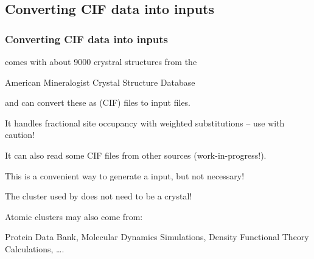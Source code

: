\subsection{ Converting CIF data into {\feff} inputs}
\begin{frame}[fragile] \frametitle{Converting CIF data into {\feff} inputs}

\begin{cenpage}{95mm}

  {\larch} comes with about 9000 crystral structures from the

\end{cenpage}

  \begin{cenpage}{75mm}
    American Mineralogist Crystal Structure Database
  \end{cenpage}

\begin{cenpage}{95mm}


  and can convert these as {}
  (CIF) files to {\feff} input files.

  \vmm
  It handles fractional site occupancy with weighted substitutions -- use
  with caution!

  \vmm
  It can also read some CIF files from other sources (work-in-progress!).

  \vmm
  This is a convenient way to generate a {\feff} input, but not necessary!

\begin{postitbox}{84mm}
  The cluster used by {\feff} does not need to be a crystal!
\end{postitbox}

\vmm
Atomic clusters may also come from:

\vmm
Protein Data Bank, Molecular Dynamics Simulations,
Density Functional Theory Calculations, \ldots.


\end{cenpage}
\end{frame}


